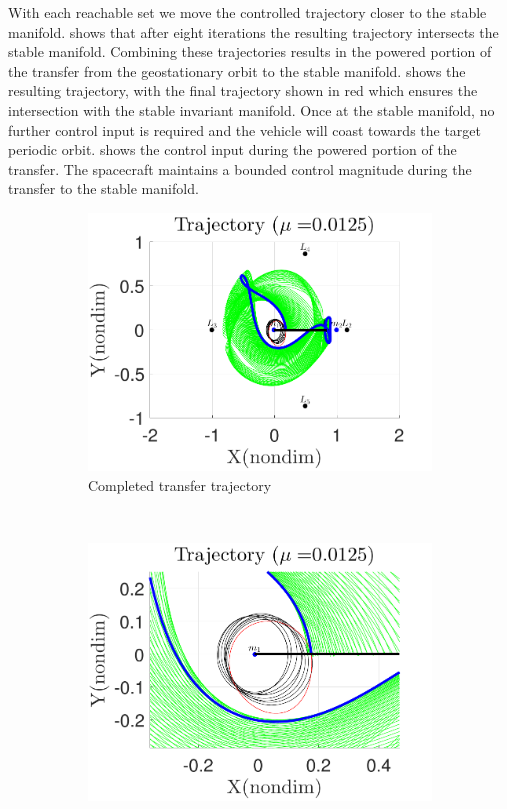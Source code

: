 \documentclass[preprint]{elsarticle}
\begin{document}
With each reachable set we move the controlled trajectory closer to the stable manifold.
 shows that after eight iterations the resulting trajectory intersects the stable manifold. 
Combining these trajectories results in the powered portion of the transfer from the geostationary orbit to the stable manifold. 
 shows the resulting trajectory, with the final trajectory shown in red which ensures the intersection with the stable invariant manifold.
Once at the stable manifold, no further control input is required and the vehicle will coast towards the target periodic orbit.
 shows the control input during the powered portion of the transfer. 
The spacecraft maintains a bounded control magnitude during the transfer to the stable manifold.
\begin{figure} 
	\centering 
	\begin{subfigure}[htbp]{0.5\textwidth} 
		\includegraphics[width=\textwidth]{geo_transfer_full} 
		\caption{Completed transfer trajectory} \label{fig:geo_transfer_full} 
	\end{subfigure}~ %
	\begin{subfigure}[htbp]{0.5\textwidth} 
		\includegraphics[width=\textwidth]{geo_transfer_zoom} 

\end{subfigure}
\end{figure}
\end{document}
